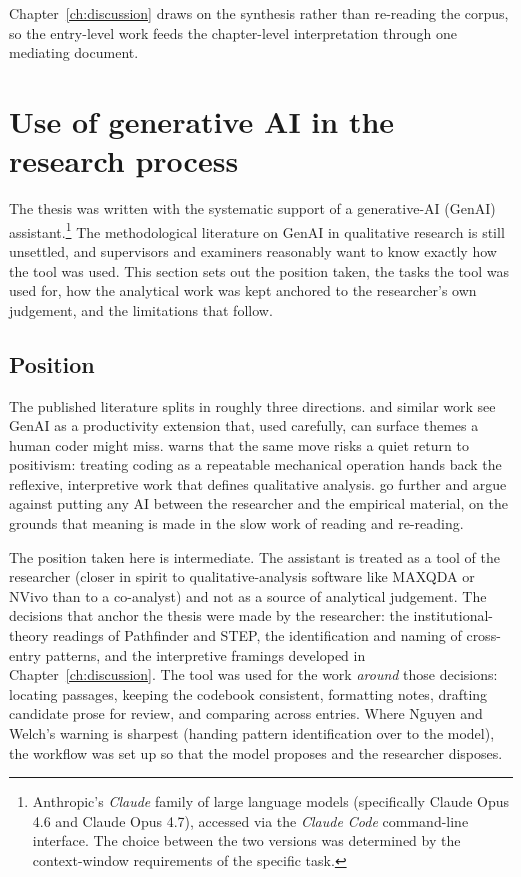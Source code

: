 Chapter~\ref{ch:discussion} draws on the synthesis rather than
re-reading the corpus, so the entry-level work feeds the chapter-level
interpretation through one mediating document.

\section{Use of generative AI in the research process}
\label{sec:meth-genai}

The thesis was written with the systematic support of a generative-AI
(GenAI) assistant.\footnote{Anthropic's \emph{Claude} family of large
language models (specifically Claude Opus 4.6 and Claude Opus 4.7),
accessed via the \emph{Claude Code} command-line interface. The
choice between the two versions was determined by the context-window
requirements of the specific task.} The
methodological literature on GenAI in qualitative research is still
unsettled, and supervisors and examiners reasonably want to know
exactly how the tool was used. This section sets out the position
taken, the tasks the tool was used for, how the analytical work was
kept anchored to the researcher's own judgement, and the limitations
that follow.

\subsection{Position}
\label{sec:meth-genai-position}

The published literature splits in roughly three directions.
\textcite{zhang2024redefining} and similar work see GenAI as a
productivity extension that, used carefully, can surface themes a
human coder might miss. \textcite{chatzichristos2025qualitative}
warns that the same move risks a quiet return to positivism: treating
coding as a repeatable mechanical operation hands back the reflexive,
interpretive work that defines qualitative analysis.
\textcite{nguyen2025engaged} go further and argue against putting any
AI between the researcher and the empirical material, on the grounds
that meaning is made in the slow work of reading and re-reading.

The position taken here is intermediate. The assistant is treated as
a tool of the researcher (closer in spirit to qualitative-analysis
software like MAXQDA or NVivo than to a co-analyst) and not as a
source of analytical judgement. The decisions that anchor the thesis
were made by the researcher: the institutional-theory readings of
Pathfinder and STEP, the identification and naming of cross-entry
patterns, and the interpretive framings developed in
Chapter~\ref{ch:discussion}. The tool was used for the work
\emph{around} those decisions: locating passages, keeping the codebook
consistent, formatting notes, drafting candidate prose for review, and
comparing across entries. Where Nguyen and Welch's warning is sharpest (handing
pattern identification over to the model), the workflow was set up so
that the model proposes and the researcher disposes.

